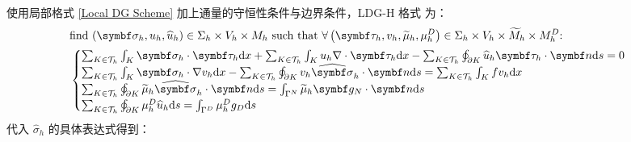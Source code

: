 使用局部格式 \eqref{Local DG Scheme} 加上通量的守恒性条件与边界条件，LDG-H 格式 \cite{10.1007/978-3-030-27230-2_3} 为：
\begin{equation}
	\begin{aligned}
		& \text{find \(\left(\bm\sigma_{h}, u_{h}, \widehat{u}_{h}\right) \in \Sigma_{h}\times V_{h}\times M_{h}\) such that \(\forall \left(\bm\tau_{h}, v_{h}, \widetilde{\mu}_{h}, \mu_{h}^{D}\right)\in\Sigma_{h}\times V_{h} \times \widetilde{M}_{h} \times M_{h}^{D}\):} \\
		& \begin{cases}
			\sum_{K \in \mathcal{T}_{h}} \int_{K} \bm\sigma_h \cdot \bm\tau_{h} \d x + \sum_{K \in \mathcal{T}_{h}} \int_{K} u_{h} \nabla \cdot \bm\tau_{h} \d x - \sum_{K \in \mathcal{T}_{h}} \oint_{\partial K} \widehat{u}_{h} \bm\tau_{h} \cdot \bm n \d s = 0 \\
			\sum_{K \in \mathcal{T}_{h}} \int_{K} \bm\sigma_{h} \cdot \nabla v_{h} \d x - \sum_{K \in \mathcal{T}_{h}} \oint_{\partial K} v_{h} \widehat{\bm\sigma}_{h} \cdot \bm n \d s = \sum_{K \in \mathcal{T}_{h}} \int_{K} f v_{h} \d x \\
			\sum_{K \in \mathcal{T}_{h}} \oint_{\partial K} \widetilde{\mu}_{h} \widehat{\bm\sigma}_{h} \cdot \bm n \d s = \int_{\Gamma^{N}} \widetilde{\mu}_{h} \bm g_{N} \cdot \bm n \d s \\
			\sum_{K \in \mathcal{T}_{h}} \oint_{\partial K} \mu_{h}^{D} \widehat{u}_{h} \d s = \int_{\Gamma^{D}} \mu_{h}^{D} g_{D} \d s
		\end{cases}
	\end{aligned}
\end{equation}
代入 \(\widehat{\sigma}_{h}\) 的具体表达式得到：
